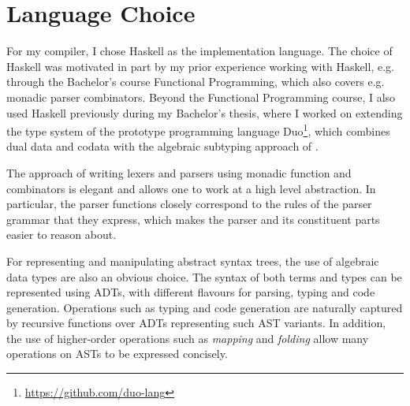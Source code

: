 \section{Language Choice}

For my compiler, I chose Haskell as the implementation language. The choice
of Haskell was motivated in part by my prior experience working with Haskell,
e.g. through the Bachelor's course Functional Programming, which also covers e.g.
monadic parser combinators.
Beyond the Functional Programming course, I also used Haskell previously during
my Bachelor's thesis, where I worked on extending the type system of the prototype
programming language Duo\footnote{\url{https://github.com/duo-lang}}, which
combines dual data and codata with the algebraic subtyping approach of
\citet{Dolan2017}.

The approach of writing lexers and parsers using monadic function and
combinators is elegant and allows one to work at a high level abstraction.
In particular, the parser functions closely correspond to the rules of the
parser grammar that they express, which makes the parser and its constituent
parts easier to reason about.

For representing and manipulating abstract syntax trees, the use of algebraic
data types are also an obvious choice. The syntax of both terms and types can be
represented using ADTs, with different flavours for parsing, typing and code
generation. Operations such as typing and code generation are naturally captured
by recursive functions over ADTs representing such AST variants.
In addition, the use of higher-order operations such as \emph{mapping} and
\emph{folding} allow many operations on ASTs to be expressed concisely.
